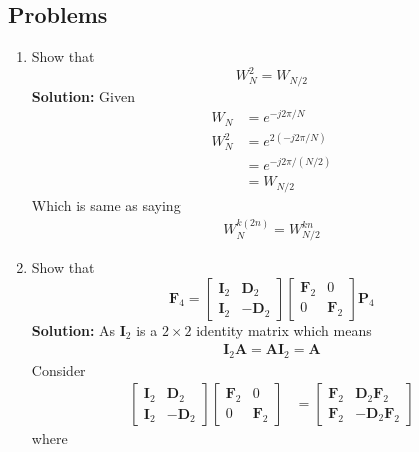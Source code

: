 \documentclass[journal,12pt,twocolumn]{IEEEtran}
\newcommand{\solution}{\noindent \textbf{Solution: }}
\providecommand{\brak}[1]{\ensuremath{\left(#1\right)}}
\let\vec\mathbf
\numberwithin{equation}{section}
\renewcommand\thesection{\arabic{section}}
\begin{document}
 \subsection{Problems}
\begin{enumerate}[label=\arabic*.,ref=\thesection.\theenumi]
\item Show that 
\begin{equation}
    W_{N}^{2}=W_{N/2}
\end{equation}
\solution Given
\begin{align}
W_{N} &= e^{-j2\pi/N}\\
 W_{N}^{2}&=e^{2\brak{-j2\pi/N}}\\
 &=e^{-j2\pi/\brak{N/2}}\\
 &=W_{N/2}
\end{align}
Which is same as saying 
\begin{align}
\label{eq:halving}
W_N^{k\brak{2n}}=W_{N/2}^{kn}
\end{align}
     \item Show that 
\begin{equation}
	\vec{F}_{4}=
\begin{bmatrix}
	\vec{I}_{2} & \vec{D}_{2} \\
\vec{I}_{2} & -\vec{D}_{2}
\end{bmatrix}
\begin{bmatrix}
\vec{F}_{2} & 0 \\
0 & \vec{F}_{2}
\end{bmatrix}
\vec{P}_{4}
\label{eq:f4qn}
\end{equation}
\solution As 
$\vec{I}_2$ is a $2\times 2$ identity matrix which means 
\begin{align}
\vec{I}_2 \vec{A}=\vec{A}\vec{I}_2=\vec{A}
\end{align}
Consider
\begin{align}
\begin{bmatrix}
	\vec{I}_{2} & \vec{D}_{2} \\
\vec{I}_{2} & -\vec{D}_{2}
\end{bmatrix}
\begin{bmatrix}
\vec{F}_{2} & 0 \\
0 & \vec{F}_{2}
\end{bmatrix}
&=\begin{bmatrix}
\vec{F}_{2} & \vec{D}_{2}\vec{F}_{2} \\
\vec{F}_{2} & -\vec{D}_{2}\vec{F}_{2}
\end{bmatrix}
\end{align}
where
\begin{align}

\end{align}
\end{enumerate}
\end{document}
